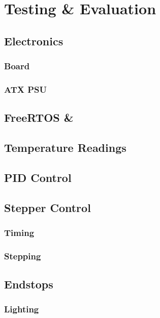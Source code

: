 \chapter{Testing \& Evaluation}
	
	\section{Electronics}
		
		\subsection{Board}
		
		\subsection{ATX PSU}
	
	\section{FreeRTOS \& \uIP}
	
	\section{Temperature Readings}
	
	\section{PID Control}
		
		\label{sec:pidtraning}
	
	\section{Stepper Control}
		
		\subsection{Timing}
		
		\subsection{Stepping}
	
	\section{Endstops}
		
		\subsection{Lighting}
	
